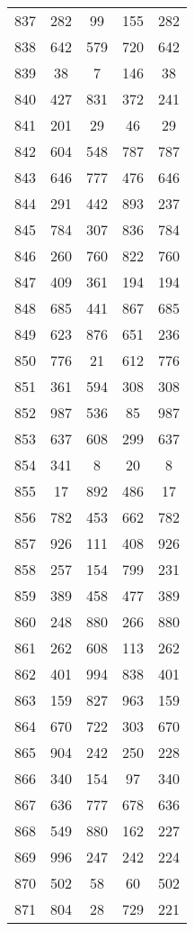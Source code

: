 \documentclass[a4paper,10pt,ngerman]{scrartcl}
\begin{document}
\begin{longtable}[c]{c|c|c|c|c}
    837 & 282 & 99 & 155 & 282 \\
    838 & 642 & 579 & 720 & 642 \\
    839 & 38 & 7 & 146 & 38 \\
    840 & 427 & 831 & 372 & 241 \\
    841 & 201 & 29 & 46 & 29 \\
    842 & 604 & 548 & 787 & 787 \\
    843 & 646 & 777 & 476 & 646 \\
    844 & 291 & 442 & 893 & 237 \\
    845 & 784 & 307 & 836 & 784 \\
    846 & 260 & 760 & 822 & 760 \\
    847 & 409 & 361 & 194 & 194 \\
    848 & 685 & 441 & 867 & 685 \\
    849 & 623 & 876 & 651 & 236 \\
    850 & 776 & 21 & 612 & 776 \\
    851 & 361 & 594 & 308 & 308 \\
    852 & 987 & 536 & 85 & 987 \\
    853 & 637 & 608 & 299 & 637 \\
    854 & 341 & 8 & 20 & 8 \\
    855 & 17 & 892 & 486 & 17 \\
    856 & 782 & 453 & 662 & 782 \\
    857 & 926 & 111 & 408 & 926 \\
    858 & 257 & 154 & 799 & 231 \\
    859 & 389 & 458 & 477 & 389 \\
    860 & 248 & 880 & 266 & 880 \\
    861 & 262 & 608 & 113 & 262 \\
    862 & 401 & 994 & 838 & 401 \\
    863 & 159 & 827 & 963 & 159 \\
    864 & 670 & 722 & 303 & 670 \\
    865 & 904 & 242 & 250 & 228 \\
    866 & 340 & 154 & 97 & 340 \\
    867 & 636 & 777 & 678 & 636 \\
    868 & 549 & 880 & 162 & 227 \\
    869 & 996 & 247 & 242 & 224 \\
    870 & 502 & 58 & 60 & 502 \\
    871 & 804 & 28 & 729 & 221 \\

\end{longtable}
\end{document}
